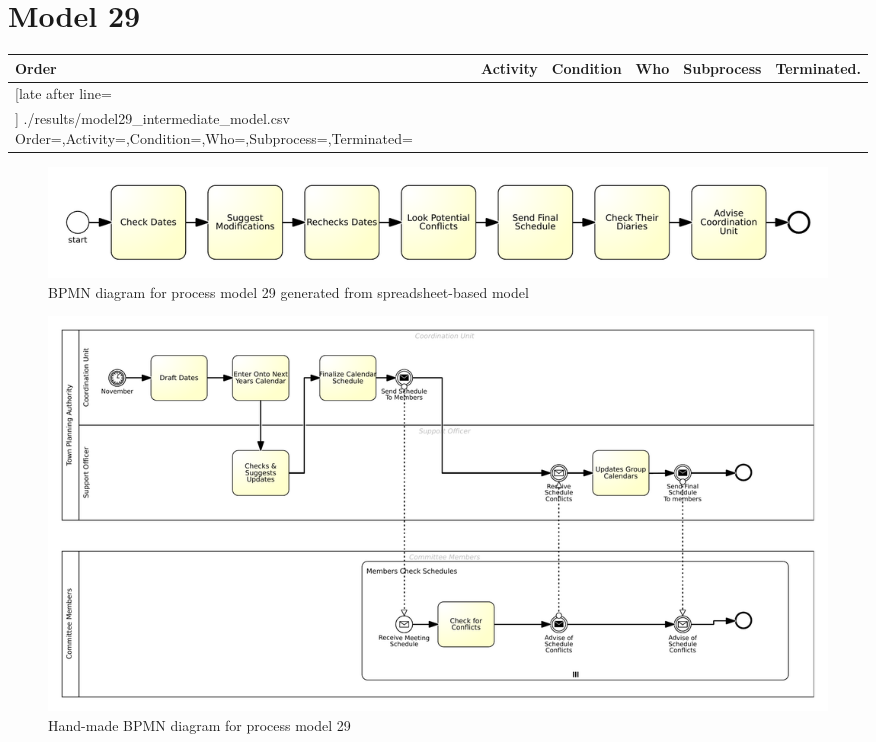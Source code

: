 \section{Model 29}
\begin{tcolorbox}[
	breakable,
	arc=0mm,
	left=1pt,
	right = 1pt,
	boxrule=0mm,
	colback = {white},
	]
	\texttt{}
\end{tcolorbox}
\label{txt:model29}

{\scriptsize
	\begin{longtable}{|p{0.03 \hsize}|p{0.25 \hsize}|p{0.15 \hsize}|p{0.2 \hsize}|p{0.1 \hsize}|p{0.1 \hsize}|}
		\hline
		Order & Activity & Condition & Who & Subprocess & Terminated.
		\\\hline\hline
		\csvreader[late after line=\\\hline]
		{./results/model29_intermediate_model.csv}
		{Order=\Order,Activity=\Activity,Condition=\Condition,Who=\Who,Subprocess=\Subprocess,Terminated=\Terminated}
		{\Order & \Activity & \Condition & \Who & \Subprocess & \Terminated}
		\caption{Spreadsheet-based description for process model 29}
		\label{csv:model29}
	\end{longtable}
}

\begin{figure}[H]
	\centering
	\includegraphics[width=\hsize]{./generated_bpmn/model29.pdf}
	\caption{BPMN diagram for process model 29 generated from spreadsheet-based model}
	\label{bpmn:generated_model29}
\end{figure}

\begin{figure}[H]
	\centering
	\includegraphics[width=\hsize]{./bpmn/model29.pdf}
	\caption{Hand-made BPMN diagram for process model 29}
	\label{bpmn:model29}
\end{figure}

